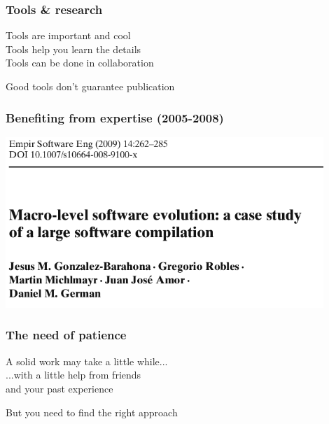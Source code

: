 \documentclass[17pt,aspectratio=169,hyperref=pdfusetitle]{beamer}
\begin{document}
\begin{frame}[fragile]
  \frametitle{Tools \& research}

  Tools are important and cool \\
  Tools help you learn the details \\
  Tools can be done in collaboration \\
  
  \begin{center}
      Good tools don't guarantee publication
  \end{center}  
  
\end{frame}


\begin{frame}[fragile]
  \frametitle{Benefiting from expertise (2005-2008)}

  \begin{center}
  \includegraphics[width=12cm]{figs/macro-evolution}
  \end{center}  
  
\end{frame}

\begin{frame}[fragile]
  \frametitle{The need of patience}

  A solid work may take a little while... \\
  ...with a little help from friends \\
  and your past experience \\
  
  \begin{center}
    But you need to find the right approach
  \end{center}  
  
\end{frame}
\end{document}
